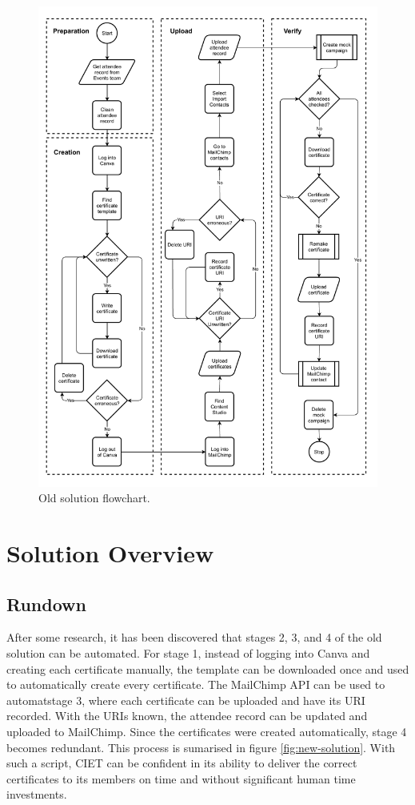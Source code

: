 \documentclass[11pt]{article}
\begin{document}
\begin{figure}[h!]
    \includegraphics[width=\textwidth]{figures/old_solution.pdf}
    \caption{Old solution flowchart.}
    \label{fig:old-solution}
\end{figure}

\newpage

\section{Solution Overview}

\subsection{Rundown}

After some research, it has been discovered that stages 2, 3, and 4 of the old solution can be automated. For stage 1, instead of logging into Canva and creating each certificate manually, the template can be downloaded once and used to automatically create every certificate. The MailChimp API can be used to automatstage 3, where each certificate can be uploaded and have its URI recorded. With the URIs known, the attendee record can be updated and uploaded to MailChimp. Since the certificates were created automatically, stage 4 becomes redundant. This process is sumarised in figure \ref{fig:new-solution}. With such a script, CIET can be confident in its ability to deliver the correct certificates to its members on time and without significant human time investments.
\end{document}
